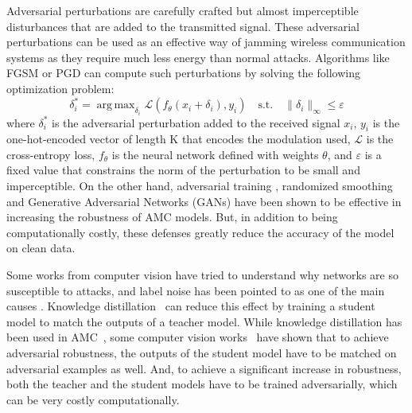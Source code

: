 \documentclass[conference]{IEEEtran}
\newcommand{\pf}[1]{{\textcolor{orange}{PF: {#1}}}}
\newcommand{\Ls}{\mathcal{L}}
\DeclareMathOperator*{\argmax}{arg\,max}
\begin{document}
Adversarial perturbations are carefully crafted but almost imperceptible disturbances that are added to the transmitted signal. These adversarial perturbations can be used as an effective way of jamming wireless communication systems as they require much less energy than normal attacks. Algorithms like FGSM \cite{Goodfellow_Shlens_Szegedy_2015} or PGD \cite{Madry_Makelov_Schmidt_Tsipras_Vladu_2019} can compute such perturbations by solving the following optimization problem:
\begin{equation}
\label{eq:adv_pert}
    \delta_i^* = \argmax_{\delta_i}\Ls(f_{\theta}(x_i + \delta_i), y_i) \quad \text{s.t.} \quad \lVert \delta_i \rVert_{\infty} \leq \varepsilon
\end{equation}
where $\delta_i^*$ is the adversarial perturbation added to the received signal $x_i$, $y_i$ is the one-hot-encoded vector of length K that encodes the modulation used, $\Ls$ is the cross-entropy loss, $f_{\theta}$ is the neural network defined with weights $\theta$, and $\varepsilon$ is a fixed value that constrains the norm of the perturbation to be small and imperceptible. On the other hand, adversarial training \cite{maroto2021safeamc,manoj2022toward}, randomized smoothing \cite{kim2021channel,manoj2022toward} and Generative Adversarial Networks (GANs) \cite{wang2022gan} have been shown to be effective in increasing the robustness of AMC models. But, in addition to being computationally costly, these defenses greatly reduce the accuracy of the model on clean data.

Some works from computer vision have tried to understand why networks are so susceptible to attacks, and label noise has been pointed to as one of the main causes \cite{sanyal2020benign}. Knowledge distillation~\cite{hinton2015distilling,romero2014fitnets,zagoruyko2016paying,chebotar2016distilling} can reduce this effect by training a student model to match the outputs of a teacher model. While knowledge distillation has been used in AMC~\cite{ma2020cross}, some computer vision works~\cite{goldblum2020adversarially,zi2021revisiting,shao2021and,maroto2022benefits} have shown that to achieve adversarial robustness, the outputs of the student model have to be matched on adversarial examples as well. And, to achieve a significant increase in robustness, both the teacher and the student models have to be trained adversarially, which can be very costly computationally.
\end{document}
